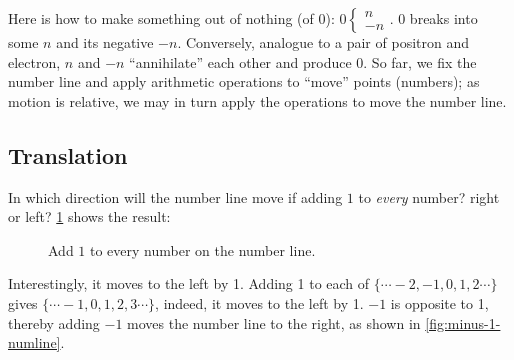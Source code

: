 \documentclass[b5paper]{article}
\begin{document}
\begin{center}
\end{center}

Here is how to make something out of nothing (of 0): $0 \begin{cases} n \\ -n \end{cases}$. 0 breaks into some $n$ and its negative $-n$. Conversely, analogue to a pair of positron and electron, $n$ and $-n$ \enquote{annihilate} each other and produce 0. So far, we fix the number line and apply arithmetic operations to \enquote{move} points (numbers); as motion is relative, we may in turn apply the operations to move the number line.

\subsection{Translation}
In which direction will the number line move if adding $1$ to {\em every} number? right or left? \cref{fig:plus-1-numline} shows the result:

\begin{figure}[htbp]
  \centering
  \caption{Add $1$ to every number on the number line.}
  \label{fig:plus-1-numline}
\end{figure}

Interestingly, it moves to the left by 1. Adding 1 to each of $\{\cdots -2, -1, 0, 1, 2 \cdots \}$ gives $\{\cdots -1, 0, 1, 2, 3 \cdots \}$, indeed, it moves to the left by 1. $-1$ is opposite to 1, thereby adding $-1$ moves the number line to the right, as shown in \cref{fig:minus-1-numline}.
\end{document}
